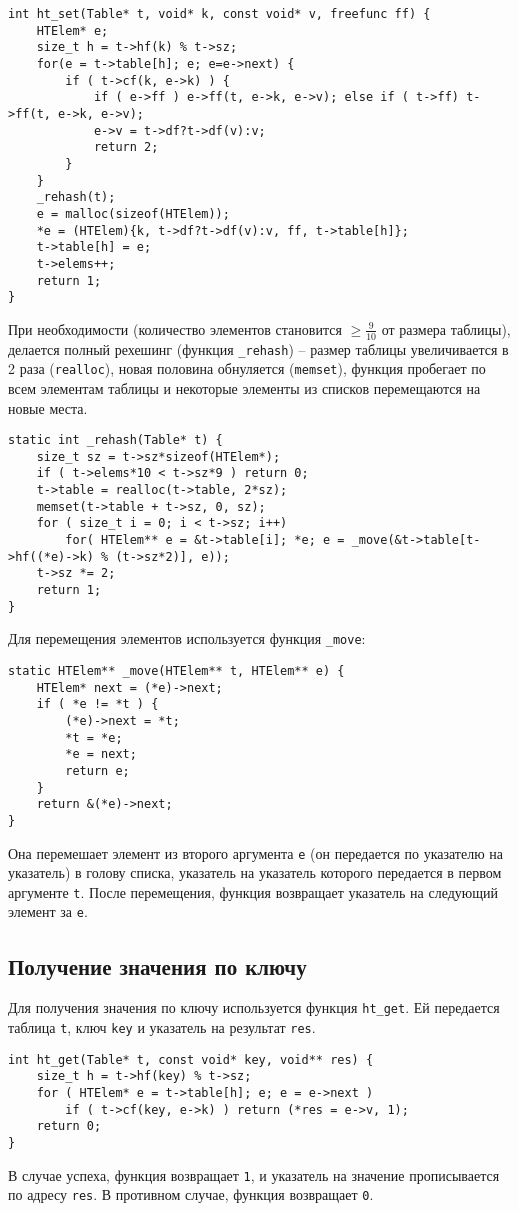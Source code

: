 \documentclass[10pt]{report}
\begin{document}
\begin{lstlisting}[firstnumber=56]
int ht_set(Table* t, void* k, const void* v, freefunc ff) {
	HTElem* e;
	size_t h = t->hf(k) % t->sz;
	for(e = t->table[h]; e; e=e->next) {
		if ( t->cf(k, e->k) ) {
			if ( e->ff ) e->ff(t, e->k, e->v); else if ( t->ff) t->ff(t, e->k, e->v);
			e->v = t->df?t->df(v):v;
			return 2;
		}
	}
	_rehash(t);
	e = malloc(sizeof(HTElem));
	*e = (HTElem){k, t->df?t->df(v):v, ff, t->table[h]};
	t->table[h] = e;
	t->elems++;
	return 1;
}
\end{lstlisting}
При необходимости (количество элементов становится $\ge \frac{9}{10}$ от размера таблицы), делается полный рехешинг (функция {\tt \_rehash}) -- размер таблицы увеличивается в 2 раза ({\tt realloc}), новая половина обнуляется ({\tt memset}), функция пробегает по всем элементам таблицы и некоторые элементы из списков перемещаются на новые места.
\begin{lstlisting}[firstnumber=45]
static int _rehash(Table* t) {
	size_t sz = t->sz*sizeof(HTElem*);
	if ( t->elems*10 < t->sz*9 ) return 0;
	t->table = realloc(t->table, 2*sz);
	memset(t->table + t->sz, 0, sz);
	for ( size_t i = 0; i < t->sz; i++) 
		for( HTElem** e = &t->table[i]; *e; e = _move(&t->table[t->hf((*e)->k) % (t->sz*2)], e));
	t->sz *= 2;
	return 1;
}
\end{lstlisting}				
Для перемещения элементов используется функция {\tt \_move}:
\begin{lstlisting}[firstnumber=34]
static HTElem** _move(HTElem** t, HTElem** e) {
	HTElem* next = (*e)->next;
	if ( *e != *t ) { 
		(*e)->next = *t;
		*t = *e;
		*e = next;
		return e;
	}
	return &(*e)->next;
}
\end{lstlisting}
Она перемешает элемент из второго аргумента {\tt e} (он передается по указателю на указатель) в голову списка, указатель на указатель которого передается в первом аргументе {\tt t}. После перемещения, функция возвращает указатель на следующий элемент за {\tt e}.

\subsection{Получение значения по ключу}
Для получения значения по ключу используется функция {\tt ht\_get}. 
Ей передается таблица {\tt t}, ключ {\tt key} и указатель на результат {\tt res}.
\begin{lstlisting}[firstnumber=74]
int ht_get(Table* t, const void* key, void** res) {
	size_t h = t->hf(key) % t->sz;
	for ( HTElem* e = t->table[h]; e; e = e->next ) 
		if ( t->cf(key, e->k) ) return (*res = e->v, 1);
	return 0;
}
\end{lstlisting}
В случае успеха, функция возвращает {\tt 1}, и указатель на значение прописывается по адресу {\tt res}.
В противном случае, функция возвращает {\tt 0}.
\end{document}
